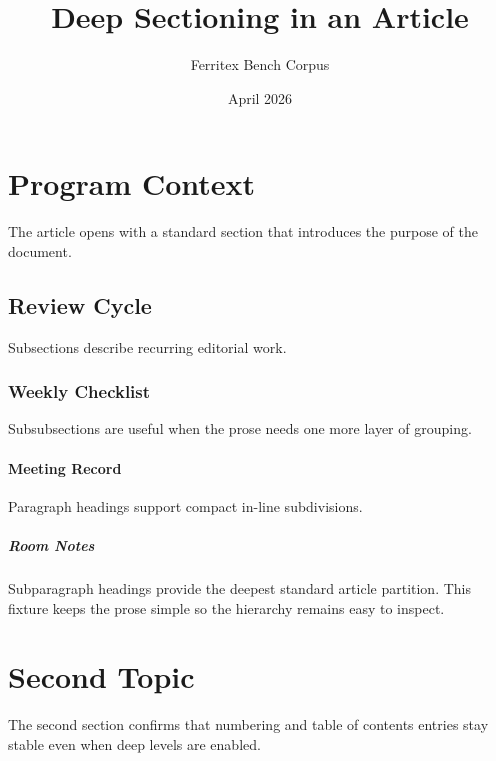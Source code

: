 \documentclass{article}
\title{Deep Sectioning in an Article}
\author{Ferritex Bench Corpus}
\date{April 2026}
\begin{document}
\maketitle
\tableofcontents

\section{Program Context}
The article opens with a standard section that introduces the purpose of the
document.

\subsection{Review Cycle}
Subsections describe recurring editorial work.

\subsubsection{Weekly Checklist}
Subsubsections are useful when the prose needs one more layer of grouping.

\paragraph{Meeting Record}
Paragraph headings support compact in-line subdivisions.

\subparagraph{Room Notes}
Subparagraph headings provide the deepest standard article partition. This
fixture keeps the prose simple so the hierarchy remains easy to inspect.

\section{Second Topic}
The second section confirms that numbering and table of contents entries stay
stable even when deep levels are enabled.
\end{document}
